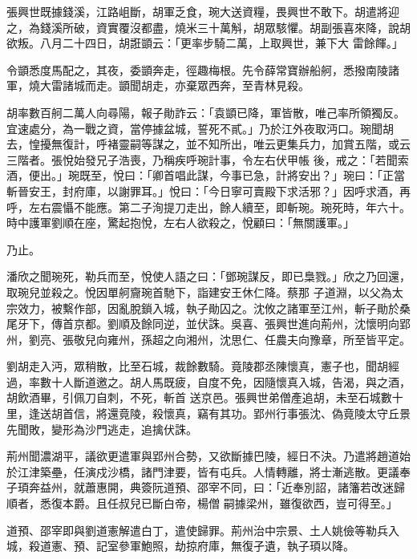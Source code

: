 \begin{pinyinscope}
 張興世既據錢溪，江路岨斷，胡軍乏食，琬大送資糧，畏興世不敢下。胡遣將迎之，為錢溪所破，資實覆沒都盡，燒米三十萬斛，胡眾駭懼。胡副張喜來降，說胡欲叛。八月二十四日，胡誑顗云：「更率步騎二萬，上取興世，兼下大
 雷餘餫。」



 令顗悉度馬配之，其夜，委顗奔走，徑趣梅根。先令薛常寶辦船舸，悉撥南陵諸軍，燒大雷諸城而走。顗聞胡走，亦棄眾西奔，至青林見殺。



 胡率數百舸二萬人向尋陽，報子勛詐云：「袁顗已降，軍皆散，唯己率所領獨反。宜速處分，為一戰之資，當停據盆城，誓死不貳。」乃於江外夜取沔口。琬聞胡去，惶擾無復計，呼褚靈嗣等謀之，並不知所出，唯云更集兵力，加賞五階，或云三階者。張悅始發兄子浩喪，乃稱疾呼琬計事，令左右伏甲帳
 後，戒之：「若聞索酒，便出。」琬既至，悅曰：「卿首唱此謀，今事已急，計將安出？」琬曰：「正當斬晉安王，封府庫，以謝罪耳。」悅曰：「今日寧可賣殿下求活邪？」因呼求酒，再呼，左右震懾不能應。第二子洵提刀走出，餘人續至，即斬琬。琬死時，年六十。時中護軍劉順在座，驚起抱悅，左右人欲殺之，悅顧曰：「無關護軍。」



 乃止。



 潘欣之聞琬死，勒兵而至，悅使人語之曰：「鄧琬謀反，即已梟戮。」欣之乃回還，取琬兒並殺之。悅因單舸齎琬首馳下，詣建安王休仁降。蔡那
 子道淵，以父為太宗效力，被繫作部，因亂脫鎖入城，執子勛囚之。沈攸之諸軍至江州，斬子勛於桑尾牙下，傳首京都。劉順及餘同逆，並伏誅。吳喜、張興世進向荊州，沈懷明向郢州，劉亮、張敬兒向雍州，孫超之向湘州，沈思仁、任農夫向豫章，所至皆平定。



 劉胡走入沔，眾稍散，比至石城，裁餘數騎。竟陵郡丞陳懷真，憲子也，聞胡經過，率數十人斷道邀之。胡人馬既疲，自度不免，因隨懷真入城，告渴，與之酒，胡飲酒畢，引佩刀自刺，不死，斬首
 送京邑。張興世弟僧產追胡，未至石城數十里，逢送胡首信，將還竟陵，殺懷真，竊有其功。郢州行事張沈、偽竟陵太守丘景先聞敗，變形為沙門逃走，追擒伏誅。



 荊州聞濃湖平，議欲更遣軍與郢州合勢，又欲斷據巴陵，經日不決。乃遣將趙道始於江津築壘，任演戍沙橋，諸門津要，皆有屯兵。人情轉離，將士漸逃散。更議奉子頊奔益州，就蕭惠開，典簽阮道預、邵宰不同，曰：「近奉別詔，諸籓若改迷歸順者，悉復本爵。且任叔兒已斷白帝，楊僧
 嗣據梁州，雖復欲西，豈可得至。」



 道預、邵宰即與劉道憲解遣白丁，遣使歸罪。荊州治中宗景、土人姚儉等勒兵入城，殺道憲、預、記室參軍鮑照，劫掠府庫，無復孑遺，執子頊以降。




\end{pinyinscope}
